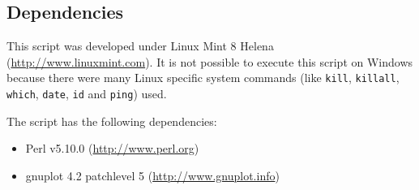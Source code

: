 \subsection{Dependencies}%
This script was developed under Linux Mint 8 Helena (\url{http://www.linuxmint.com}).
It is not possible to execute this script on Windows because there were many Linux specific system commands
(like \texttt{kill}, \texttt{killall}, \texttt{which}, \texttt{date}, \texttt{id} and \texttt{ping}) used.

The script has the following dependencies:
\begin{itemize}
	\item Perl v5.10.0 (\url{http://www.perl.org})
	\item gnuplot 4.2 patchlevel 5 (\url{http://www.gnuplot.info})
\end{itemize}
